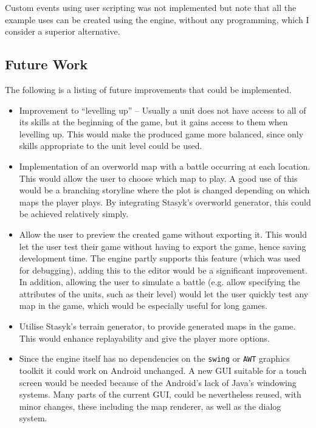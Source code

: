 Custom events using user scripting was not implemented but note that all the example uses can be created using the engine, without any programming, which I consider a superior alternative. 

\subsection{Future Work}

The following is a listing of future improvements that could be implemented. 

\begin{itemize}
\item Improvement to ``levelling up'' -- Usually a unit does not have access to all of its skills at the beginning of the game, but it gains access to them when levelling up.  This would make the produced game  more balanced, since only skills appropriate to the unit level could be used.

\item Implementation of an overworld map with a battle occurring at each location. This would allow the user to choose which map to play.  A good use of this would be a branching storyline where the plot is changed depending on which maps the player plays. By integrating Stasyk's overworld generator, this could be achieved relatively simply.
 
\item  Allow the user to preview the created game without exporting it.  This would let the user test their game without having to export the game, hence saving development time.  The engine partly supports this feature (which was used for debugging), adding this to the editor would be a significant improvement. In addition, allowing the user to simulate a battle (e.g. allow specifying the attributes of the units, such as their level)  would let the user quickly test any map in the game, which would be especially useful for long games.

\item Utilise Stasyk's terrain generator, to provide generated maps in the game. This would enhance replayability and give the player more options. 

\item Since the engine itself has no dependencies on the \texttt{swing} or \texttt{AWT} graphics toolkit it could work on Android unchanged. A new GUI suitable for a touch screen would be needed because of the Android's lack of Java's windowing systems. Many parts of the current GUI, could be nevertheless reused, with minor changes, these including the map renderer, as well as the dialog system. 

\end{itemize}

